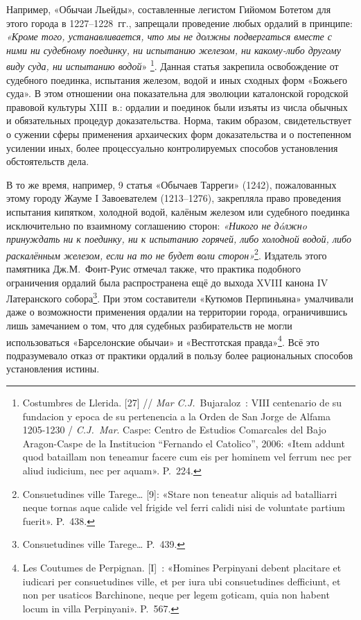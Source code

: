 Например, «Обычаи Льейды», составленные легистом Гийомом Ботетом для этого города в 1227--1228~гг., запрещали проведение любых ордалий в принципе: \emph{«Кроме того, устанавливается, что мы не должны подвергаться вместе с ними ни судебному поединку, ни испытанию железом, ни какому-либо другому виду суда, ни испытанию водой}» \footnote{Costumbres de Llerida. [27] // \emph{Mar C.J.}~Bujaraloz~: VIII centenario de su fundacion y epoca de su pertenencia a la Orden de San Jorge de Alfama 1205-1230 / \emph{C.J.~Mar}. Caspe: Centro de Estudios Comarcales del Bajo Aragon-Caspe de la Institucion “Fernando el Catolico”, 2006: «Item addunt quod bataillam non teneamur facere cum eis per hominem vel ferrum nec per aliud iudicium, nec per aquam». P.~224.}. Данная статья закрепила освобождение от судебного поединка, испытания железом, водой и иных сходных форм «Божьего суда». В этом отношении она показательна для эволюции каталонской городской правовой культуры XIII~в.: ордалии и поединок были изъяты из числа обычных и обязательных процедур доказательства. Норма, таким образом, свидетельствует о сужении сферы применения архаических форм доказательства и о постепенном усилении иных, более процессуально контролируемых способов установления обстоятельств дела.

В то же время, например, 9 статья «Обычаев Тарреги» (1242), пожалованных этому городу Жауме I Завоевателем (1213--1276), закрепляла право проведения испытания кипятком, холодной водой, калёным железом или судебного поединка исключительно по взаимному соглашению сторон: \emph{«Никого не }\emph{дóлжн}\emph{o}\emph{ принуждать ни к поединку, ни к испытанию горячей, либо холодной водой, либо раскалённым железом, если на то не будет воли сторон»}\footnote{Consuetudines ville Tarege… [9]: «Stare non teneatur aliquis ad batalliarri neque tornas aque calide vel frigide vel ferri calidi nisi de voluntate partium fuerit». P.~438.}. Издатель этого памятника Дж.М.~Фонт-Руис отмечал также, что практика подобного ограничения ордалий была распространена ещё до выхода XVIII канона IV Латеранского собора\footnote{Consuetudines ville Tarege… P.~439.}. При этом составители «Кутюмов Перпиньяна» умалчивали даже о возможности применения ордалии на территории города, ограничившись лишь замечанием о том, что для судебных разбирательств не могли использоваться «Барселонские обычаи» и «Вестготская правда»\footnote{Les Coutumes de Perpignan. [I]~: «Homines Perpinyani debent placitare et iudicari per consuetudines ville, et per iura ubi consuetudines defficiunt, et non per usaticos Barchinone, neque per legem goticam, quia non habent locum in villa Perpinyani». P.~567.}. Всё это подразумевало отказ от практики ордалий в пользу более рациональных способов установления истины.

